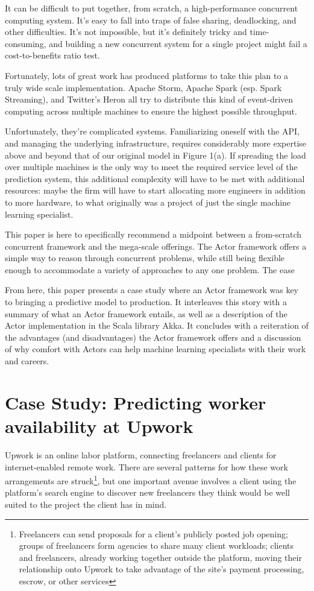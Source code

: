\documentclass{article}
\begin{document}
 It can be difficult to put together, from scratch, a high-performance
concurrent computing system. It's easy to fall into traps of false sharing,
deadlocking, and other difficulties. It's not impossible, but it's definitely
tricky and time-consuming, and building a new concurrent system for a single
project might fail a cost-to-benefits ratio test.

 Fortunately, lots of great work has produced platforms to take this plan to a
truly wide scale implementation. Apache Storm, Apache Spark (esp. Spark
Streaming), and Twitter's Heron all try to distribute this kind of event-driven
computing across multiple machines to ensure the highest possible throughput.

 Unfortunately, they're complicated systems. Familiarizing oneself with the API,
and managing the underlying infrastructure, requires considerably more expertise
above and beyond that of our original model in Figure 1(a). If spreading the
load over multiple machines is the only way to meet the required service level
of the prediction system, this additional complexity will have to be met with
additional resources: maybe the firm will have to start allocating more
engineers in addition to more hardware, to what originally was a project of just
the single machine learning specialist.

 This paper is here to specifically recommend a midpoint between a from-scratch
concurrent framework and the mega-scale offerings. The Actor framework offers a
simple way to reason through concurrent problems, while still being flexible
enough to accommodate a variety of approaches to any one problem. The ease

 From here, this paper presents a case study where an Actor framework was key to
bringing a predictive model to production. It interleaves this story with a
summary of what an Actor framework entails, as well as a description of the
Actor implementation in the Scala library Akka. It concludes with a reiteration
of the advantages (and disadvantages) the Actor framework offers and a
discussion of why comfort with Actors can help machine learning specialists with
their work and careers.

\section{Case Study: Predicting worker availability at Upwork}

 Upwork is an online labor platform, connecting freelancers and clients for
internet-enabled remote work. There are several patterns for how these work
arrangements are struck\footnote{Freelancers can send proposals for a client's
publicly posted job opening; groups of freelancers form agencies to share many
client workloads; clients and freelancers, already working together outside the
platform, moving their relationship onto Upwork to take advantage of the site's
payment processing, escrow, or other services}, but one important avenue
involves a client using the platform's search engine to discover new freelancers
they think would be well suited to the project the client has in mind.
\end{document}
